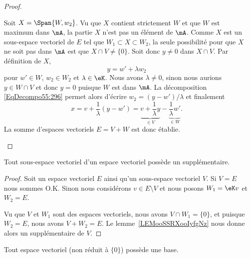 \begin{proof}
\begin{subproof}
		Soit \( X=\Span\{ W,w_2 \}\). Vu que \( X\) contient strictement \( W\) et que \( W\) est maximum dans \( \mA\), la partie \( X\) n'est pas un élément de \( \mA\). Comme \( X\) est un sous-espace vectoriel de \( E\) tel que \( W_1\subset X\subset W_2\), la seule possibilité pour que \( X\) ne soit pas dans \( \mA\) est que \( X\cap V\neq \{ 0 \}\). Soit donc \( y\neq 0\) dans \( X\cap V\). Par définition de \( X\),
		\begin{equation}      \label{EqDecompo55:296}
			y=w'+\lambda w_2
		\end{equation}
		pour \( w'\in W\), \( w_2\in W_2\) et \( \lambda\in \eK\). Nous avons \( \lambda\neq 0\), sinon nous aurions \( y\in W\cap V \) et donc \(y = 0 \) puisque \( W \) est dans \( \mA \). La décomposition \eqref{EqDecompo55:296} permet alors d'écrire \( w_2=(y-w')/\lambda\) et finalement
		\begin{equation}
			x=v+\frac{1}{ \lambda }(y-w')=\underbrace{v+\frac{1}{ \lambda }y}_{\in V}-\underbrace{\frac{1}{ \lambda }w'}_{\in W}.
		\end{equation}
		La somme d'espaces vectoriels \( E=V+W\) est donc établie.
	\end{subproof}
\end{proof}

\begin{corollary}
	Tout sous-espace vectoriel d'un espace vectoriel possède un supplémentaire.
\end{corollary}

\begin{proof}
	Soit un espace vectoriel \( E\) ainsi qu'un sous-espace vectoriel \( V\). Si \( V=E\) nous sommes O.K. Sinon nous considérons \( v\in E\setminus V\) et nous posons \( W_1=\eK v\) et \( W_2=E\).

	Vu que \( V\) et \( W_1\) sont des espaces vectoriels, nous avons \( V\cap W_1=\{ 0 \}\), et puisque \( W_2=E\), nous avons \( V+W_2=E\). Le lemme~\ref{LEMooSSRXooIyfgNz} nous donne alors un supplémentaire de \( V\).
\end{proof}

\begin{proposition}        \label{PROPooHDCEooMhDjPi}
	Tout espace vectoriel (non réduit à \( \{ 0 \}\)) possède une base.
\end{proposition}

